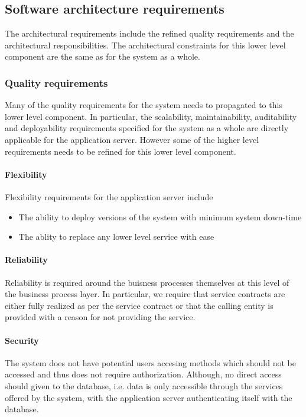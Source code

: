 \documentclass[a4paper,12pt]{report}
\begin{document}
\subsection {Software architecture requirements}
The architectural requirements include the refined quality requirements and the architectural responsibilities. The architectural constraints for this lower level component are the same as for the system as a whole.

\subsubsection {Quality requirements}
Many of the quality requirements for the system needs to propagated to this lower level component.
In particular, the scalability, maintainability, auditability and deployability requirements specified for the system as a whole are directly applicable for the application server. However some of the higher level requirements needs to be refined for this lower level component.

\paragraph {Flexibility} 
\hfill \break
 Flexibility requirements for the application server include
	\begin{itemize}
		\item The ability to deploy versions of the system with minimum system down-time
		\item The ablity to replace any lower level service with ease
	\end{itemize}
\paragraph {Reliability}
\hfill \break
	Reliability is required around the buisness processes themselves at this level of the business process layer.
	In particular, we require that service contracts are either fully realized as per the service contract or that the calling entity is provided with a reason  for not providing the service.

\paragraph {Security}
\hfill \break
The system does not have potential users accesing methods which should not be accessed and thus does not require authorization. Although, no direct access should given to the database, i.e. data is only accessible through the services offered by the system, with the application server authenticating itself with the database.
\end{document}
